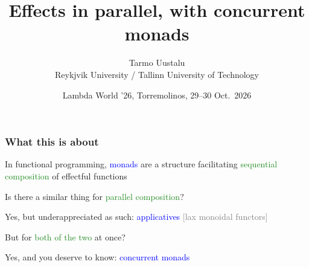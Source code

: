 \documentclass[aspectratio=169,11pt]{beamer}
\title{Effects in parallel, with concurrent monads}
\author{Tarmo Uustalu \\
  Reykjvik University / Tallinn University of Technology}
\date{Lambda World '26, Torremolinos, 29--30 Oct.\ 2026}
\newcommand{\ema}[1]{\textcolor{blue}{#1}}
\newcommand{\emb}[1]{\textcolor{forestgreen}{#1}}
\newcommand{\gray}[1]{\textcolor{gray}{#1}}
\begin{document}
\begin{frame}


\maketitle  

\end{frame}    



\begin{frame}

\frametitle{What this is about}

  In functional programming, \ema{monads} are a structure facilitating
  \emb{sequential composition} of effectful functions

\bigskip
  
  Is there a similar thing for \emb{parallel composition}?

  Yes, but underappreciated as such: \ema{applicatives} \gray{[lax
  monoidal functors]}

\bigskip

  But for \emb{both of the two} at once?

  Yes, and you deserve to know: \ema{concurrent monads}
  

\end{frame}





\end{document}
